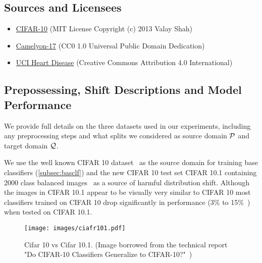 \subsection{Sources and Licensees}\label{subsec:sources-and-licensees}
\begin{itemize}
    \item \href{https://peltarion.com/knowledge-center/documentation/terms/dataset-licenses/cifar-10}{CIFAR-10} (MIT License Copyright (c) 2013 Valay Shah)
    \item \href{https://camelyon17.grand-challenge.org/Data/}{Camelyon-17} (CC0 1.0 Universal Public Domain Dedication)
    \item \href{https://archive.ics.uci.edu/ml/datasets/Heart+Disease}{UCI Heart Disease} (Creative Commons Attribution 4.0 International)
\end{itemize}

\subsection{Prepossessing, Shift Descriptions and Model Performance}
\label{subsec:predata}
We provide full details on the three datasets used in our experiments, including any preprocessing steps and what splits we considered as source domain $\mathcal{P}$ and target domain $\mathcal{Q}$.

\smallbreak
{}
We use the well known CIFAR 10 dataset~\citep{krizhevsky2014cifar} as the source domain for training base classifiers (\autoref{subsec:basclf}) and the new CIFAR 10 test set CIFAR 10.1 containing 2000 class balanced images~\citep{cifar101} as a source of harmful distribution shift.
Although the images in CIFAR 10.1 appear to be visually very similar to CIFAR 10 most classifiers trained on CIFAR 10 drop significantly in performance (3\% to 15\%~\citep{cifar101}) when tested on CIFAR 10.1.
\begin{figure}[!htb]
    \centering
    \texttt{[image: images/ciafr101.pdf]}
    \caption{Cifar 10 vs Cifar 10.1. (Image borrowed from the technical report "Do CIFAR-10 Classifiers Generalize to CIFAR-10?"~\citep{ciafr10101})}
    \label{fig:cifar101}
\end{figure}


